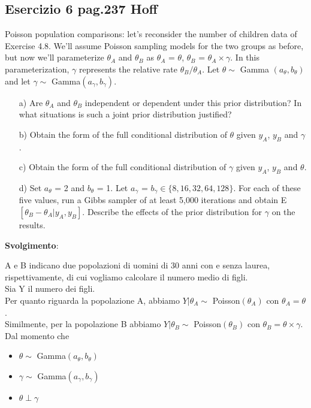 \subsection{Esercizio 6 pag.237   Hoff}

Poisson population comparisons: let’s reconsider the number of children data of Exercise 4.8. We’ll assume Poisson sampling models for the two
groups as before, but now we’ll parameterize $\theta_{A}$ and $\theta_B$ as $\theta_A$ = $\theta$, $\theta_B$ = $\theta_A \times \gamma$. In this parameterization, $\gamma$ represents the relative rate $\theta_B/\theta_A$. Let $\theta \sim$ Gamma $(a_\theta, b_\theta)$ and let $\gamma \sim$ Gamma$(a_\gamma, b_\gamma)$.
\begin{enumerate}
\item [a)]Are $\theta_A$ and $\theta_B$ independent or dependent under this prior distribution?
In what situations is such a joint prior distribution justified?
\item [b)]Obtain the form of the full conditional distribution of $\theta$ given $y_A$, $y_B$ and $\gamma$.
\item [c)]Obtain the form of the full conditional distribution of $\gamma$ given $y_A$, $y_B$ and $\theta$.
\item [d)]Set $a_\theta$ = 2 and $b_\theta$ = 1. Let $a_\gamma$ = $b_\gamma \in \lbrace 8, 16, 32, 64, 128 \rbrace $. For each of these five values, run a Gibbs sampler of at least 5,000 iterations and obtain E$[\theta_B - \theta_A|y_A, y_B]$. Describe the effects of the prior distribution for $\gamma$ on the results.
\end{enumerate}

\textbf{Svolgimento}:
\bigskip

A e B indicano due popolazioni di uomini di 30 anni con e senza laurea, rispettivamente, di cui vogliamo calcolare il numero medio di figli.\\

Sia Y il numero dei figli.\\

Per quanto riguarda la popolazione A, abbiamo $Y|\theta_A \sim$ Poisson$(\theta_A)$ con $\theta_A=\theta$.\\

Similmente, per la popolazione B abbiamo $Y|\theta_B \sim$ Poisson$(\theta_B)$ con $\theta_B=\theta \times \gamma$.\\ 

Dal momento che
\begin{itemize}
\item $\theta \sim$ Gamma$(a_\theta, b_\theta)$
\item $\gamma \sim$ Gamma$(a_\gamma, b_\gamma)$
\item $\theta \perp \gamma$
\end{itemize}

